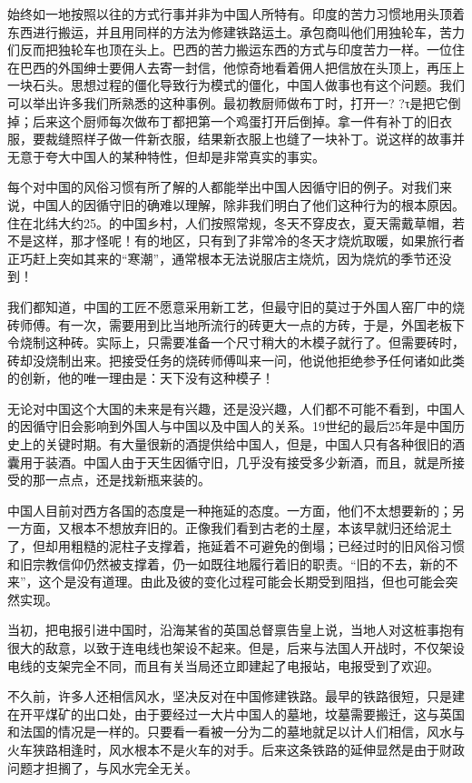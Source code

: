 \documentclass[12pt,oneside]{book}
\begin{document}
\begin{common-format}
始终如一地按照以往的方式行事并非为中国人所特有。印度的苦力习惯地用头顶着东西进行搬运，并且用同样的方法为修建铁路运土。承包商叫他们用独轮车，苦力们反而把独轮车也顶在头上。巴西的苦力搬运东西的方式与印度苦力一样。一位住在巴西的外国绅士要佣人去寄一封信，他惊奇地看着佣人把信放在头顶上，再压上一块石头。思想过程的僵化导致行为模式的僵化，中国人做事也有这个问题。我们可以举出许多我们所熟悉的这种事例。最初教厨师做布丁时，打开一? ?τ是把它倒掉；后来这个厨师每次做布丁都把第一个鸡蛋打开后倒掉。拿一件有补丁的旧衣服，要裁缝照样子做一件新衣服，结果新衣服上也缝了一块补丁。说这样的故事并无意于夸大中国人的某种特性，但却是非常真实的事实。 

每个对中国的风俗习惯有所了解的人都能举出中国人因循守旧的例子。对我们来说，中国人的因循守旧的确难以理解，除非我们明白了他们这种行为的根本原因。住在北纬大约25。的中国乡村，人们按照常规，冬天不穿皮衣，夏天需戴草帽，若不是这样，那才怪呢！有的地区，只有到了非常冷的冬天才烧炕取暖，如果旅行者正巧赶上突如其来的“寒潮”，通常根本无法说服店主烧炕，因为烧炕的季节还没到！ 

我们都知道，中国的工匠不愿意采用新工艺，但最守旧的莫过于外国人窑厂中的烧砖师傅。有一次，需要用到比当地所流行的砖更大一点的方砖，于是，外国老板下令烧制这种砖。实际上，只需要准备一个尺寸稍大的木模子就行了。但需要砖时，砖却没烧制出来。把接受任务的烧砖师傅叫来一问，他说他拒绝参予任何诸如此类的创新，他的唯一理由是：天下没有这种模子！ 

无论对中国这个大国的未来是有兴趣，还是没兴趣，人们都不可能不看到，中国人的因循守旧会影响到外国人与中国以及中国人的关系。19世纪的最后25年是中国历史上的关键时期。有大量很新的酒提供给中国人，但是，中国人只有各种很旧的酒囊用于装酒。中国人由于天生因循守旧，几乎没有接受多少新酒，而且，就是所接受的那一点点，还是找新瓶来装的。 

中国人目前对西方各国的态度是一种拖延的态度。一方面，他们不太想要新的；另一方面，又根本不想放弃旧的。正像我们看到古老的土屋，本该早就归还给泥土了，但却用粗糙的泥柱子支撑着，拖延着不可避免的倒塌；已经过时的旧风俗习惯和旧宗教信仰仍然被支撑着，仍一如既往地履行着旧的职责。“旧的不去，新的不来”，这个是没有道理。由此及彼的变化过程可能会长期受到阻挡，但也可能会突然实现。 

当初，把电报引进中国时，沿海某省的英国总督禀告皇上说，当地人对这桩事抱有很大的敌意，以致于连电线也架设不起来。但是，后来与法国人开战时，不仅架设电线的支架完全不同，而且有关当局还立即建起了电报站，电报受到了欢迎。 

不久前，许多人还相信风水，坚决反对在中国修建铁路。最早的铁路很短，只是建在开平煤矿的出口处，由于要经过一大片中国人的墓地，坟墓需要搬迁，这与英国和法国的情况是一样的。只要看一看被一分为二的墓地就足以计人们相信，风水与火车狭路相逢时，风水根本不是火车的对手。后来这条铁路的延伸显然是由于财政问题才担搁了，与风水完全无关。 


\end{common-format}
\end{document}
